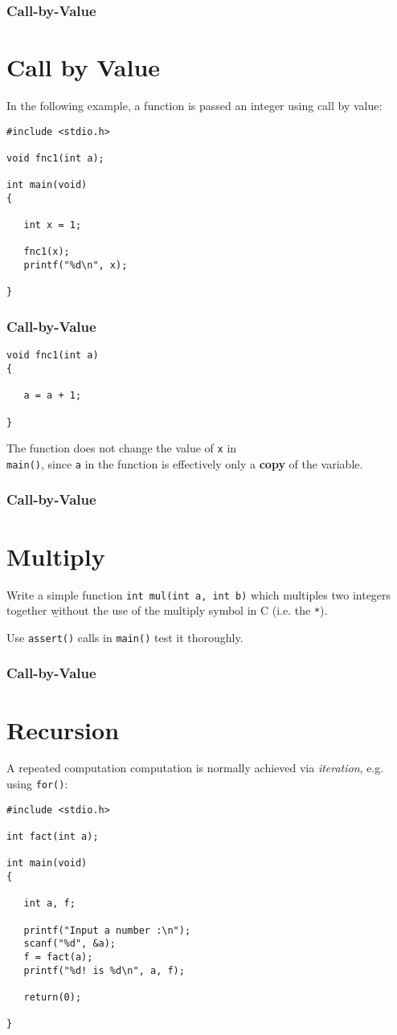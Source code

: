 \begin{frame}[fragile]
\frametitle{Call-by-Value}
\section*{Call by Value}

In the following example, a function is passed an integer
using call by value:

\begin{verbatim}
#include <stdio.h>

void fnc1(int a);

int main(void)
{

   int x = 1;

   fnc1(x);
   printf("%d\n", x);

}
\end{verbatim}
\end{frame}


\begin{frame}[fragile]
\frametitle{Call-by-Value}
\begin{verbatim}
void fnc1(int a)
{

   a = a + 1;

}
\end{verbatim}

The function does not change the value of \verb^x^ in\\
\verb^main()^, since \verb^a^ in the function is effectively
only a {\bf copy} of the variable.
\end{frame}

\begin{frame}[fragile]
\frametitle{Call-by-Value}
\section*{Multiply}
Write a simple function \verb^int mul(int a, int b)^ which
multiples two integers together {\b without} the use of the
multiply symbol in C (i.e. the \verb^*^).

Use \verb^assert()^ calls in \verb^main()^ test it thoroughly.
\end{frame}

\begin{frame}[fragile]
\frametitle{Call-by-Value}
\section*{Recursion}

{\samepage
A repeated computation computation is normally
achieved via {\it iteration}, e.g. using \verb^for()^:

\begin{verbatim}
#include <stdio.h>

int fact(int a);

int main(void)
{

   int a, f;

   printf("Input a number :\n");
   scanf("%d", &a);
   f = fact(a);
   printf("%d! is %d\n", a, f);

   return(0);

}
\end{verbatim}
}
\end{frame}

